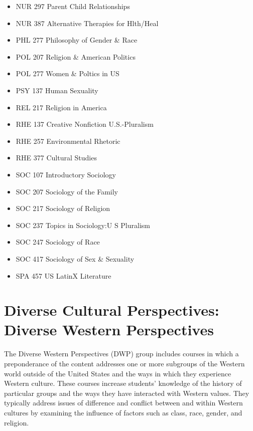 \documentclass[
  letterpaper,
]{scrbook}
\begin{document}
\begin{itemize}
\item
  NUR 297 Parent Child Relationships
\item
  NUR 387 Alternative Therapies for Hlth/Heal
\item
  PHL 277 Philosophy of Gender \& Race
\item
  POL 207 Religion \& American Politics
\item
  POL 277 Women \& Poltics in US
\item
  PSY 137 Human Sexuality
\item
  REL 217 Religion in America
\item
  RHE 137 Creative Nonfiction U.S.-Pluralism
\item
  RHE 257 Environmental Rhetoric
\item
  RHE 377 Cultural Studies
\item
  SOC 107 Introductory Sociology
\item
  SOC 207 Sociology of the Family
\item
  SOC 217 Sociology of Religion
\item
  SOC 237 Topics in Sociology:U S Pluralism
\item
  SOC 247 Sociology of Race
\item
  SOC 417 Sociology of Sex \& Sexuality
\item
  SPA 457 US LatinX Literature
\end{itemize}

\section{Diverse Cultural Perspectives: Diverse Western
Perspectives}\label{sec-diverse-cultural-perspectives-western}

The Diverse Western Perspectives (DWP) group includes courses in which a
preponderance of the content addresses one or more subgroups of the
Western world outside of the United States and the ways in which they
experience Western culture. These courses increase students' knowledge
of the history of particular groups and the ways they have interacted
with Western values. They typically address issues of difference and
conflict between and within Western cultures by examining the influence
of factors such as class, race, gender, and religion.
\end{document}
